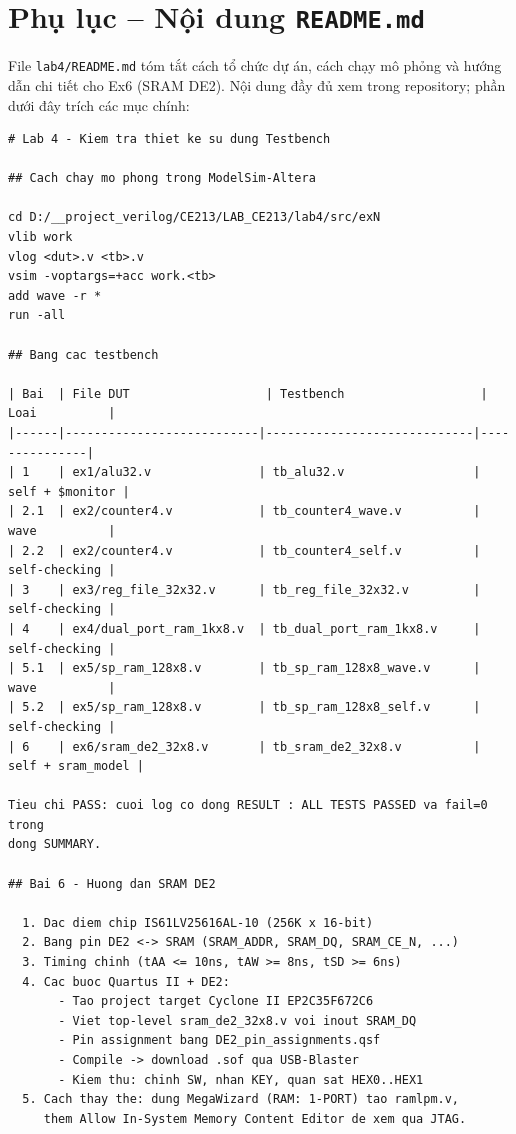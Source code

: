 \documentclass[12pt,a4paper]{article}
\begin{document}
\section{Phụ lục -- Nội dung \texttt{README.md}}

File \texttt{lab4/README.md} tóm tắt cách tổ chức dự án, cách chạy mô phỏng và hướng dẫn chi tiết cho Ex6 (SRAM DE2). Nội dung đầy đủ xem trong repository; phần dưới đây trích các mục chính:

\begin{lstlisting}[style=md, caption={Trích lược \texttt{lab4/README.md}}]
# Lab 4 - Kiem tra thiet ke su dung Testbench

## Cach chay mo phong trong ModelSim-Altera

cd D:/__project_verilog/CE213/LAB_CE213/lab4/src/exN
vlib work
vlog <dut>.v <tb>.v
vsim -voptargs=+acc work.<tb>
add wave -r *
run -all

## Bang cac testbench

| Bai  | File DUT                   | Testbench                   | Loai          |
|------|---------------------------|-----------------------------|---------------|
| 1    | ex1/alu32.v               | tb_alu32.v                  | self + $monitor |
| 2.1  | ex2/counter4.v            | tb_counter4_wave.v          | wave          |
| 2.2  | ex2/counter4.v            | tb_counter4_self.v          | self-checking |
| 3    | ex3/reg_file_32x32.v      | tb_reg_file_32x32.v         | self-checking |
| 4    | ex4/dual_port_ram_1kx8.v  | tb_dual_port_ram_1kx8.v     | self-checking |
| 5.1  | ex5/sp_ram_128x8.v        | tb_sp_ram_128x8_wave.v      | wave          |
| 5.2  | ex5/sp_ram_128x8.v        | tb_sp_ram_128x8_self.v      | self-checking |
| 6    | ex6/sram_de2_32x8.v       | tb_sram_de2_32x8.v          | self + sram_model |

Tieu chi PASS: cuoi log co dong RESULT : ALL TESTS PASSED va fail=0 trong
dong SUMMARY.

## Bai 6 - Huong dan SRAM DE2

  1. Dac diem chip IS61LV25616AL-10 (256K x 16-bit)
  2. Bang pin DE2 <-> SRAM (SRAM_ADDR, SRAM_DQ, SRAM_CE_N, ...)
  3. Timing chinh (tAA <= 10ns, tAW >= 8ns, tSD >= 6ns)
  4. Cac buoc Quartus II + DE2:
       - Tao project target Cyclone II EP2C35F672C6
       - Viet top-level sram_de2_32x8.v voi inout SRAM_DQ
       - Pin assignment bang DE2_pin_assignments.qsf
       - Compile -> download .sof qua USB-Blaster
       - Kiem thu: chinh SW, nhan KEY, quan sat HEX0..HEX1
  5. Cach thay the: dung MegaWizard (RAM: 1-PORT) tao ramlpm.v,
     them Allow In-System Memory Content Editor de xem qua JTAG.
\end{lstlisting}
\end{document}
